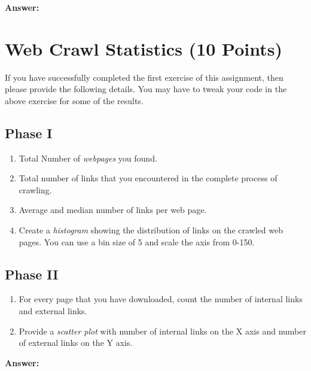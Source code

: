 \documentclass{WeSTassignment}
\begin{document}
\textbf{Answer:}



\section{Web Crawl Statistics (10 Points)}

If you have successfully completed the first exercise of this assignment, then please provide the following details. You may have to tweak your code in the above exercise for some of the results. 
\subsection{Phase I}
\begin{enumerate}
\item Total Number of \emph{webpages} you found.
\item Total number of links that you encountered in the complete process of crawling.
\item Average and median number of links per web page.
\item Create a \emph{histogram} showing the distribution of links on the crawled web pages. You can use a bin size of 5 and scale the axis from 0-150.
\end{enumerate}

\subsection{Phase II}
\begin{enumerate}
\item For every page that you have downloaded, count the number of internal links and external links. 
\item Provide a \emph{scatter plot} with number of internal links on the X axis and number of external links on the Y axis.
\end{enumerate}

\textbf{Answer:}







\makefooter
\end{document}
